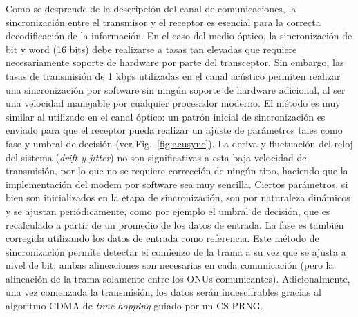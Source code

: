Como se desprende de la descripción del canal de comunicaciones, la sincronización entre el transmisor y el receptor es esencial para la correcta decodificación de la información. 
En el caso del medio óptico, la sincronización de bit y word (16 bits) debe realizarse a tasas tan elevadas que requiere necesariamente soporte de hardware por parte del transceptor.
Sin embargo, las tasas de transmisión de 1 kbps utilizadas en el canal acústico permiten realizar una sincronización por software sin ningún soporte de hardware adicional, al ser una velocidad manejable por cualquier procesador moderno.
El método es muy similar al utilizado en el canal óptico: un patrón inicial de sincronización es enviado para que el receptor pueda realizar un ajuste de parámetros tales como fase y umbral de decisión (ver Fig.~\ref{fig:acusync}). La deriva y fluctuación del reloj del sistema (\textit{drift y jitter}) no son significativas a esta baja velocidad de transmisión, por lo que no se requiere corrección de ningún tipo, haciendo que la implementación del modem por software sea muy sencilla.
Ciertos parámetros, si bien son inicializados en la etapa de sincronización, son por naturaleza dinámicos y se ajustan periódicamente, como por ejemplo el umbral de decisión, que es recalculado a partir de un promedio de los datos de entrada. La fase es también corregida utilizando los datos de entrada como referencia. Este método de sincronización permite detectar el comienzo de la trama a su vez que se ajusta a nivel de bit; ambas alineaciones son necesarias en cada comunicación (pero la alineación de la trama solamente entre los ONUs comunicantes). Adicionalmente, una vez comenzada la transmisión, los datos serán indescifrables gracias al algoritmo CDMA de \textit{time-hopping} guiado por un CS-PRNG.



